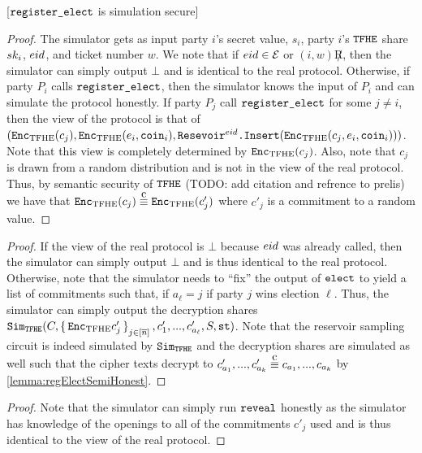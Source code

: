 \begin{lemma}
	\label{lemma:regElectSemiHonest}
	[$\texttt{register\_elect}$ is simulation secure]
	\begin{proof}
		The simulator gets as input party $i$'s secret value, $s_i$, party $i$'s ${\texttt{TFHE}}$ share $sk_i$,
		${eid}$, and ticket number $w$. We note that if ${eid} \in \mathcal{E}$ or $(i, w) \not R$, then the simulator can simply output $\bot$ and
		is identical to the real protocol.
		Otherwise, if party $P_i$ calls $\texttt{register\_elect}$, then the simulator knows the input of $P_i$ and can simulate the protocol
		honestly. If party $P_j$ call $\texttt{register\_elect}$ for some $j \neq i$, then the view of the protocol
		is that of $(\texttt{Enc}_{\mathrm{TFHE}}(c_j), \texttt{Enc}_{\mathrm{TFHE}}(e_i, \texttt{coin}_i), \texttt{Resevoir}^{{eid}}\texttt{.Insert}(\texttt{Enc}_{\mathrm{TFHE}}(c_j, e_i, \texttt{coin}_i)))$.
		Note that this view is completely determined by $\texttt{Enc}_{\mathrm{TFHE}}(c_j)$. Also, note that $c_j$ is drawn
		from a random distribution and is not in the view of the real protocol. Thus, 
		by semantic security of ${\texttt{TFHE}}$ (TODO: add citation and refrence to prelis) we have that
		$\Enc(c_j) \compInd \Enc(c'_j)$ where $c'_j$ is a commitment to a random value.
	\end{proof}
\end{lemma}

\begin{lemma}
\begin{proof}
	If the view of the real protocol is $\bot$ because ${eid}$ was already called, then the simulator can simply output $\bot$
	and is thus identical to the real protocol.
	Otherwise, note that the simulator needs to ``fix'' the output of $\texttt{elect}$ to yield
	a list of commitments such that, if $a_\ell = j$ if party $j$ wins election $\ell$.
	Thus, the simulator can simply output the decryption shares $\texttt{Sim}_{{\texttt{TFHE}}}(C, \set{\texttt{Enc}_{\mathrm{TFHE}}{c'_j}}_{j \in [\overline{n}]}, c'_1, ..., c'_{a_\ell}, S, \texttt{st})$.
	Note that the reservoir sampling circuit is indeed simulated by $\texttt{Sim}_{{\texttt{TFHE}}}$
	and the decryption shares are simulated as well such that the cipher texts decrypt
	to $c'_{a_1}, ..., c'_{a_k} \compInd c_{a_1}, ..., c_{a_k}$ by \cref{lemma:regElectSemiHonest}.
\end{proof}	
\end{lemma}

\begin{lemma}
	\begin{proof}
		Note that the simulator can simply run $\texttt{reveal}$ honestly as the simulator has knowledge of the openings to all of the commitments $c'_j$ used
		and is thus identical to the view of the real protocol.
	\end{proof}
	
\end{lemma}


